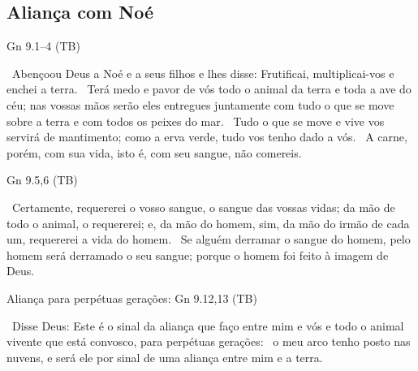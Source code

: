 \documentclass[12pt,aspectratio=169]{beamer}
\newcommand{\ver}[1]{%
    \raisebox{0.50ex}{%
        \scalebox{1.1}{%
            \pmb{\textbf{\textcolor{BSpbg}{#1}}}%
        }%
    }%
}
\newcommand{\QUOTE}[1]{%
    \par\noindent\hspace*{0.05\linewidth}%
    \begin{minipage}{0.9\linewidth}%
        \linespread{1.35}\large{#1}%
    \end{minipage}%
}
\newcommand{\RED}[1]{{\textcolor{TXred}{#1}}}
\newcommand{\ORA}[1]{{\textcolor{TXred!50!TXyel}{#1}}}
\newcommand{\YEL}[1]{{\textcolor{TXyel}{#1}}}
\newcommand{\GRE}[1]{{\textcolor{TXgre}{#1}}}
\newcommand{\CYA}[1]{{\textcolor{TXcya}{#1}}}
\newcommand{\BRI}[1]{{\textcolor{BSpbg}{#1}}}   %
\begin{document}
    \subsection{Aliança com Noé}

    \begin{frame}{Gn 9.1--4 (TB)}
        \QUOTE{%
            \ver{1}~Abençoou Deus a Noé e a seus filhos e lhes disse: \YEL{Frutificai,
            multiplicai-vos e enchei a terra}.
            \ver{2}~Terá \ORA{medo e pavor de vós todo o animal da terra e toda a ave do céu};
            nas vossas mãos serão eles entregues juntamente com tudo o que se move sobre a terra
            e com todos os peixes do mar.
            \ver{3}~Tudo o que se move e vive vos servirá de mantimento; \YEL{como a erva verde,
            tudo vos tenho dado a vós}.
            \ver{4}~A carne, porém, com sua vida, isto é, com seu \RED{sangue, não comereis}.
        }
    \end{frame}

    \begin{frame}{Gn 9.5,6 (TB)}
        \QUOTE{%
            \ver{5}~\YEL{Certamente, requererei o vosso sangue}, o sangue das vossas vidas;
            \ORA{da mão de todo o animal, o requererei}; e, \RED{da mão do homem}, sim, da mão
            do irmão de cada um, requererei a vida do homem.
            \ver{6}~\YEL{Se alguém derramar o sangue do homem}, \GRE{pelo homem será derramado o
            seu sangue}; porque \CYA{o homem foi feito à imagem de Deus}.
        }
    \end{frame}

    \begin{frame}{Aliança para \BRI{perpétuas gerações}: Gn 9.12,13 (TB)}
        \QUOTE{%
            \ver{12}~Disse Deus: Este é o \YEL{sinal da aliança} que faço entre mim e vós e todo
            o animal vivente que está convosco, para \BRI{perpétuas gerações}:
            \ver{13}~\YEL{o meu arco} tenho posto nas nuvens, e será ele por sinal de uma
            \YEL{aliança entre mim e a terra}.
        }
    \end{frame}
\end{document}
